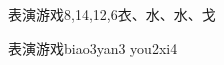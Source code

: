 \begin{entry}{表演游戏}{8,14,12,6}{⾐、⽔、⽔、⼽}
  \begin{phonetics}{表演游戏}{biao3yan3 you2xi4}
  \end{phonetics}
\end{entry}
